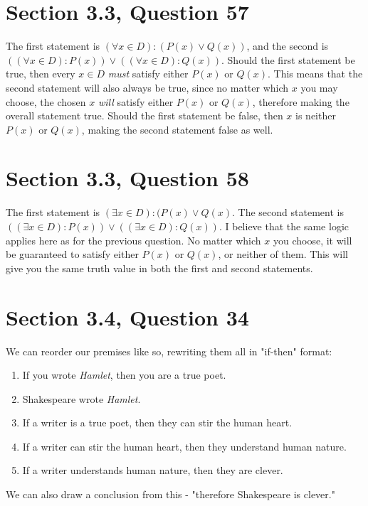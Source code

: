 \documentclass{article}
\begin{document}
\section{Section 3.3, Question 57}
The first statement is $(\forall x \in D) : (P(x) \vee Q(x))$, and the second is $((\forall x \in D) : P(x)) \vee ((\forall x \in D) : Q(x))$. Should the first statement be true, then every $x \in D$ \textit{must} satisfy either $P(x)$ or $Q(x)$.  This means that the second statement will also always be true, since no matter which $x$ you may choose, the chosen $x$ \textit{will} satisfy either $P(x)$ or $Q(x)$, therefore making the overall statement true. Should the first statement be false, then $x$ is neither $P(x)$ or $Q(x)$, making the second statement false as well.

\section{Section 3.3, Question 58}
The first statement is $(\exists x \in D) : (P(x) \vee Q(x)$. The second statement is $((\exists x \in D) : P(x)) \vee ((\exists x \in D) : Q(x))$. I believe that the same logic applies here as for the previous question. No matter which $x$ you choose, it will be guaranteed to satisfy either $P(x)$ or $Q(x)$, or neither of them. This will give you the same truth value in both the first and second statements.

\section{Section 3.4, Question 34}
We can reorder our premises like so, rewriting them all in "if-then" format:
\begin{enumerate}
    \item If you wrote \textit{Hamlet}, then you are a true poet.
    \item Shakespeare wrote \textit{Hamlet}.
    \item If a writer is a true poet, then they can stir the human heart.
    \item If a writer can stir the human heart, then they understand human nature.
    \item If a writer understands human nature, then they are clever.
\end{enumerate}
We can also draw a conclusion from this - "therefore Shakespeare is clever."
\end{document}
